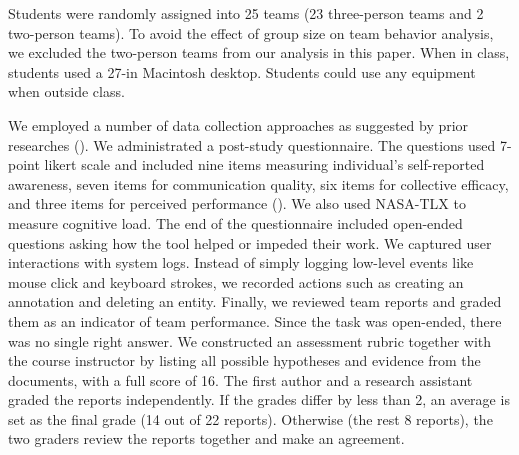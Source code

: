 Students were randomly assigned into 25 teams (23 three-person teams and 2
two-person teams). To avoid the effect of group size on team behavior analysis, we excluded the two-person teams from our analysis in this paper. When in class, students used a 27-in Macintosh desktop. Students could use any equipment when outside class.

We employed a number of data collection approaches as suggested by prior researches (\cite{Convertino2011, Goyal2016}). We administrated a post-study
questionnaire. The questions used 7-point likert scale and included nine items measuring individual's
self-reported awareness, seven items for
communication quality, six items for collective efficacy, and three items for perceived performance (\cite{Convertino2011}). We also used NASA-TLX \cite{Hart1988} to measure cognitive load. The end of the questionnaire
included open-ended questions asking how the tool helped or impeded their
work. We captured user interactions with system logs. Instead of simply logging
low-level events like mouse click and keyboard strokes, we recorded actions such
as creating an annotation and deleting an entity. Finally, we reviewed team
reports and graded them as an indicator of team performance. Since the task was
open-ended, there was no single right answer. We constructed an assessment
rubric together with the course instructor by listing all possible hypotheses
and evidence from the documents, with a full score of 16. The first author and a
research assistant graded the reports independently. If the grades differ by
less than 2, an average is set as the final grade (14 out of 22 reports).
Otherwise (the rest 8 reports), the two graders review the reports together and
make an agreement.
